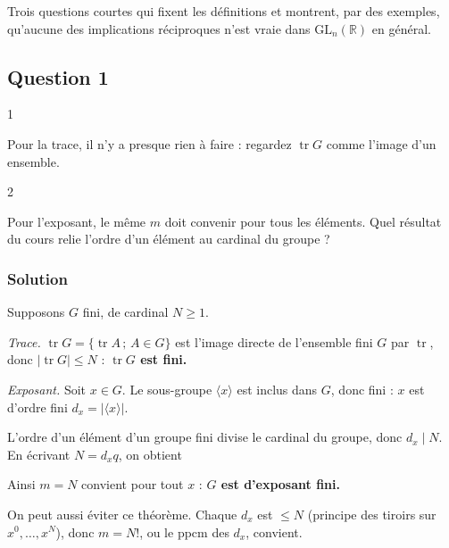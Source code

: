 \documentclass[11pt,a4paper]{article}
\newcommand{\equationajustee}[1]{%
  \sbox{\boiteequation}{$\displaystyle #1$}%
  \ifdim\wd\boiteequation>\linewidth
    \[\resizebox{\linewidth}{!}{\usebox{\boiteequation}}\]%
  \else
    \[#1\]%
  \fi}
\begin{document}
Trois questions courtes qui fixent les définitions et montrent, par des exemples, qu'aucune des implications réciproques n'est vraie dans \({\mathrm{GL}}_n(\mathbb{R})\) en général.

\hypertarget{question-1}{%
\subsection{Question 1}\label{question-1}}

\begin{indication}{1}

Pour la trace, il n'y a presque rien à faire : regardez \(\operatorname{tr}G\) comme l'image d'un ensemble.

\end{indication}

\begin{indication}{2}

Pour l'exposant, le même \(m\) doit convenir pour tous les éléments. Quel résultat du cours relie l'ordre d'un élément au cardinal du groupe ?

\end{indication}

\hypertarget{solution}{%
\subsubsection{Solution}\label{solution}}

Supposons \(G\) fini, de cardinal \(N\geqslant1\).

\emph{Trace.} \(\operatorname{tr}G=\{\operatorname{tr}A\,;\,A\in G\}\) est l'image directe de l'ensemble fini \(G\) par \(\operatorname{tr}\), donc \(|\operatorname{tr}G|\leqslant N\) : \textbf{\(\operatorname{tr}G\) est fini.}

\emph{Exposant.} Soit \(x\in G\). Le sous-groupe \(\langle x\rangle\) est inclus dans \(G\), donc fini : \(x\) est d'ordre fini \(d_x=|\langle x\rangle|\).

L'ordre d'un élément d'un groupe fini divise le cardinal du groupe, donc \(d_x\mid N\). En écrivant \(N=d_xq\), on obtient

\equationajustee{x^N=(x^{d_x})^q=I_n.}

Ainsi \(m=N\) convient pour tout \(x\) : \textbf{\(G\) est d'exposant fini.}

On peut aussi éviter ce théorème. Chaque \(d_x\) est \(\leqslant N\) (principe des tiroirs sur \(x^0,\dots,x^N\)), donc \(m=N!\), ou le ppcm des \(d_x\), convient.
\end{document}
